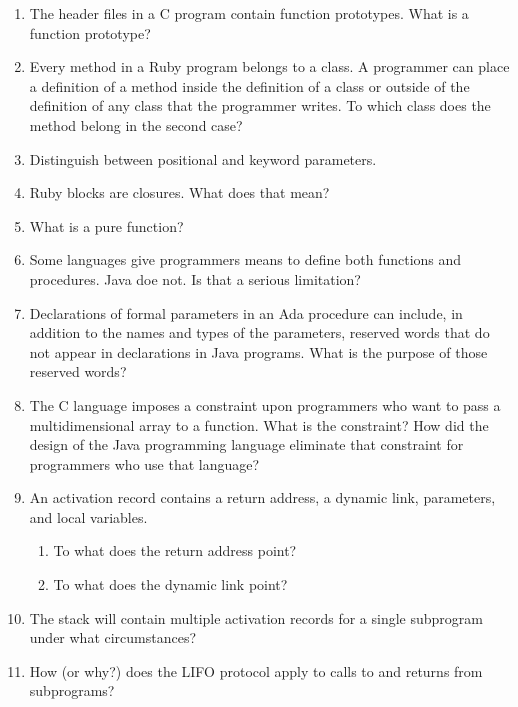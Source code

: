 \begin{enumerate}
  \item The header files in a C program contain function
    prototypes. What is a function prototype?

  \item Every method in a Ruby program belongs to a class.
    A programmer can place a definition of a method inside
    the definition of a class or outside of the definition
    of any class that the programmer writes. To which class
    does the method belong in the second case?

  \item Distinguish between positional and keyword parameters.

  \item Ruby blocks are closures. What does that mean?

  \item What is a pure function?

  \item Some languages give programmers means to define
    both functions and procedures. Java doe not. Is that
    a serious limitation?

  \item Declarations of formal parameters in an Ada procedure
    can include, in addition to the names and types of the
    parameters, reserved words that do not appear in declarations
    in Java programs. 
    What is the purpose of those reserved words?
 
  \item The C language imposes a constraint upon programmers
    who want to pass a multidimensional array to a function.
    What is the constraint? How did the design of the Java
    programming language eliminate that constraint for 
    programmers who use that language?

  \item An activation record contains a return
    address, a dynamic link, parameters, and
    local variables.
  \begin{enumerate}
    \item To what does the return address point?
    \item To what does the dynamic link point?
    \end{enumerate}

  \item The stack will contain multiple activation
    records for a single subprogram under what
    circumstances?

  \item How (or why?) does the LIFO protocol apply to
    calls to and returns from subprograms?


\end{enumerate}

